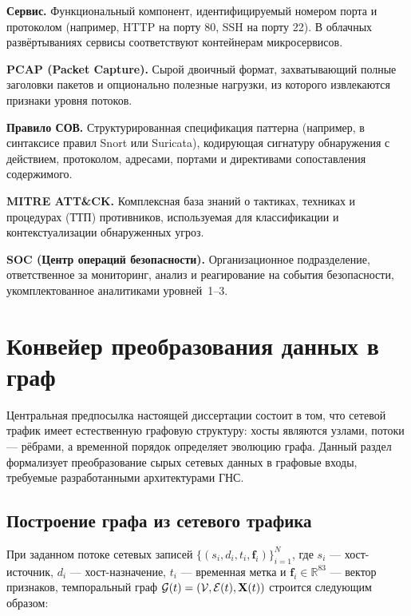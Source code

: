 \noindent\textbf{Сервис.} Функциональный компонент, идентифицируемый номером порта и протоколом (например, HTTP на порту 80, SSH на порту 22). В облачных развёртываниях сервисы соответствуют контейнерам микросервисов.

\noindent\textbf{PCAP (Packet Capture).} Сырой двоичный формат, захватывающий полные заголовки пакетов и опционально полезные нагрузки, из которого извлекаются признаки уровня потоков.

\noindent\textbf{Правило СОВ.} Структурированная спецификация паттерна (например, в синтаксисе правил Snort или Suricata), кодирующая сигнатуру обнаружения с действием, протоколом, адресами, портами и директивами сопоставления содержимого.

\noindent\textbf{MITRE ATT\&CK.} Комплексная база знаний о тактиках, техниках и процедурах (ТТП) противников, используемая для классификации и контекстуализации обнаруженных угроз.

\noindent\textbf{SOC (Центр операций безопасности).} Организационное подразделение, ответственное за мониторинг, анализ и реагирование на события безопасности, укомплектованное аналитиками уровней~1--3.


\section{Конвейер преобразования данных в граф}
\label{sec:data_to_graph}

Центральная предпосылка настоящей диссертации состоит в том, что сетевой трафик имеет естественную графовую структуру: хосты являются узлами, потоки --- рёбрами, а временной порядок определяет эволюцию графа. Данный раздел формализует преобразование сырых сетевых данных в графовые входы, требуемые разработанными архитектурами ГНС.

\subsection{Построение графа из сетевого трафика}

При заданном потоке сетевых записей $\{(s_i, d_i, t_i, \mathbf{f}_i)\}_{i=1}^{N}$, где $s_i$ --- хост-источник, $d_i$ --- хост-назначение, $t_i$ --- временная метка и $\mathbf{f}_i\in\mathbb{R}^{83}$ --- вектор признаков, темпоральный граф $\mathcal{G}(t)=(\mathcal{V},\mathcal{E}(t),\mathbf{X}(t))$ строится следующим образом:

